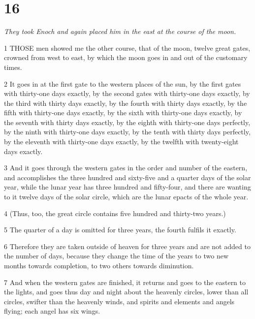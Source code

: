 \chapter{16}

\par \textit{They took Enoch and again placed him in the east at the course of the moon.}

\par 1 THOSE men showed me the other course, that of the moon, twelve great gates, crowned from west to east, by which the moon goes in and out of the customary times.

\par 2 It goes in at the first gate to the western places of the sun, by the first gates with thirty-one days exactly, by the second gates with thirty-one days exactly, by the third with thirty days exactly, by the fourth with thirty days exactly, by the fifth with thirty-one days exactly, by the sixth with thirty-one days exactly, by the seventh with thirty days exactly, by the eighth with thirty-one days perfectly, by the ninth with thirty-one days exactly, by the tenth with thirty days perfectly, by the eleventh with thirty-one days exactly, by the twelfth with twenty-eight days exactly.

\par 3 And it goes through the western gates in the order and number of the eastern, and accomplishes the three hundred and sixty-five and a quarter days of the solar year, while the lunar year has three hundred and fifty-four, and there are wanting to it twelve days of the solar circle, which are the lunar epacts of the whole year.

\par 4 (Thus, too, the great circle contains five hundred and thirty-two years.)

\par 5 The quarter of a day is omitted for three years, the fourth fulfils it exactly.

\par 6 Therefore they are taken outside of heaven for three years and are not added to the number of days, because they change the time of the years to two new months towards completion, to two others towards diminution.

\par 7 And when the western gates are finished, it returns and goes to the eastern to the lights, and goes thus day and night about the heavenly circles, lower than all circles, swifter than the heavenly winds, and spirits and elements and angels flying; each angel has six wings.

